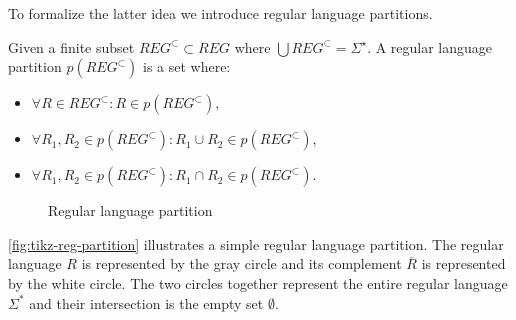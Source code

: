 To formalize the latter idea we introduce regular language partitions.

\begin{definition}
    Given a finite subset $REG^\subset \subset REG$ where $\bigcup REG^\subset = \Sigma^\star$.
    A regular language partition $p(REG^\subset)$ is a set where:
    \begin{itemize}
        \item $\forall R \in REG^\subset : R \in p(REG^\subset)$,
        \item $\forall R_1, R_2 \in p(REG^\subset) : R_1 \cup R_2 \in p(REG^\subset)$,
        \item $\forall R_1, R_2 \in p(REG^\subset) : R_1 \cap R_2 \in p(REG^\subset)$.
    \end{itemize}
\end{definition}

\begin{figure}
    \caption{Regular language partition}
    \label{fig:tikz-reg-partition}
\end{figure}

\autoref{fig:tikz-reg-partition} illustrates a simple regular language partition. The regular language $R$ is represented by the gray circle and its complement $\overline{R}$ is represented by the white circle. The two circles together represent the entire regular language $\Sigma^*$ and their intersection is the empty set $\emptyset$.


